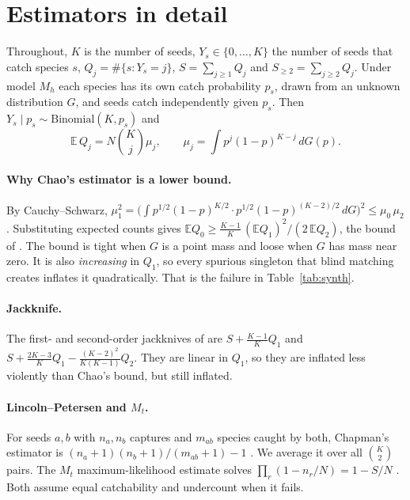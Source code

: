 \section{Estimators in detail}
\label{app:estimators}

Throughout, $K$ is the number of seeds, $Y_s\in\{0,\dots,K\}$ the number of seeds that catch species $s$, $Q_j=\#\{s: Y_s=j\}$, $S=\sum_{j\ge1}Q_j$ and $S_{\ge2}=\sum_{j\ge2}Q_j$. Under model $M_h$ each species has its own catch probability $p_s$, drawn from an unknown distribution $G$, and seeds catch independently given $p_s$. Then $Y_s\mid p_s\sim\mathrm{Binomial}(K,p_s)$ and
\begin{equation}
\mathbb E\,Q_j = N\binom{K}{j}\mu_j,\qquad \mu_j=\int p^j(1-p)^{K-j}\,dG(p).
\end{equation}

\paragraph{Why Chao's estimator is a lower bound.} By Cauchy--Schwarz, $\mu_1^2=\big(\int p^{1/2}(1-p)^{K/2}\cdot p^{1/2}(1-p)^{(K-2)/2}\,dG\big)^2\le\mu_0\,\mu_2$. Substituting expected counts gives $\mathbb E Q_0\ge\frac{K-1}{K}\,(\mathbb EQ_1)^2/(2\,\mathbb EQ_2)$, the bound of \citet{chao1987estimating}. The bound is tight when $G$ is a point mass and loose when $G$ has mass near zero. It is also \emph{increasing} in $Q_1$, so every spurious singleton that blind matching creates inflates it quadratically. That is the failure in Table~\ref{tab:synth}.

\paragraph{Jackknife.} The first- and second-order jackknives of \citet{burnham1978estimation} are $S+\frac{K-1}{K}Q_1$ and $S+\frac{2K-3}{K}Q_1-\frac{(K-2)^2}{K(K-1)}Q_2$. They are linear in $Q_1$, so they are inflated less violently than Chao's bound, but still inflated.

\paragraph{Lincoln--Petersen and $M_t$.} For seeds $a,b$ with $n_a,n_b$ captures and $m_{ab}$ species caught by both, Chapman's estimator is $(n_a+1)(n_b+1)/(m_{ab}+1)-1$ \citep{chapman1951some}. We average it over all $\binom K2$ pairs. The $M_t$ maximum-likelihood estimate solves $\prod_r(1-n_r/N)=1-S/N$ \citep{darroch1958multiple}. Both assume equal catchability and undercount when it fails.

